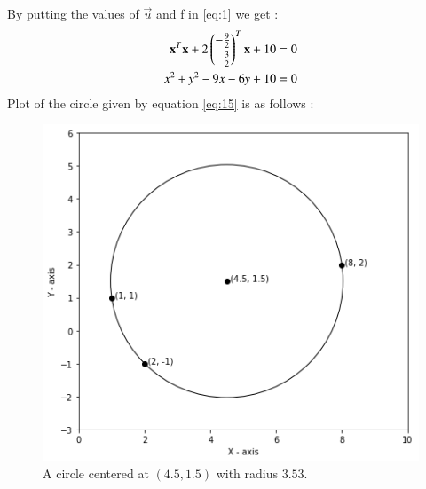 \documentclass[journal,12pt,twocolumn]{IEEEtran}
\begin{document}
By putting the values of $\vec{u}$ and f in \eqref{eq:1} we get : 
\begin{align}
\mathbf{x}^T\mathbf{x}+2\begin{pmatrix}-\frac{9}{2}\\[0.1cm]-\frac{3}{2}\end{pmatrix}^T\mathbf{x}+10&=0\label{eq:14}\\
x^2+y^2-9x-6y+10&=0\label{eq:15}
\end{align}
Plot of the circle given by equation \eqref{eq:15} is as follows :
\begin{figure}[h]
\centering
    \includegraphics[width=\columnwidth]{circle2.png}
    \caption{A circle centered at $(4.5, 1.5)$ with radius $3.53$.}
    \label{circle}
\end{figure}
\end{document}
